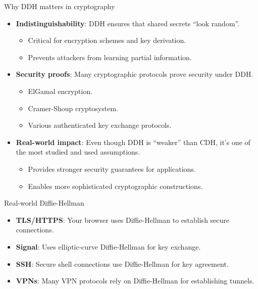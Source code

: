 \documentclass[aspectratio=169, lualatex, handout]{beamer}
\begin{document}
\begin{frame}{Why DDH matters in cryptography}
	\begin{itemize}[<+->]
		\item \textbf{Indistinguishability}: DDH ensures that shared secrets ``look random''.
		      \begin{itemize}
			      \item Critical for encryption schemes and key derivation.
			      \item Prevents attackers from learning partial information.
		      \end{itemize}
		\item \textbf{Security proofs}: Many cryptographic protocols prove security under DDH.
		      \begin{itemize}
			      \item ElGamal encryption.
			      \item Cramer-Shoup cryptosystem.
			      \item Various authenticated key exchange protocols.
		      \end{itemize}
		\item \textbf{Real-world impact}: Even though DDH is ``weaker'' than CDH, it's one of the most studied and used assumptions.
		      \begin{itemize}
			      \item Provides stronger security guarantees for applications.
			      \item Enables more sophisticated cryptographic constructions.
		      \end{itemize}
	\end{itemize}
\end{frame}

\begin{frame}{Real-world Diffie-Hellman}
	\begin{itemize}[<+->]
		\item \textbf{TLS/HTTPS}: Your browser uses Diffie-Hellman to establish secure connections.
		\item \textbf{Signal}: Uses elliptic-curve Diffie-Hellman for key exchange.
		\item \textbf{SSH}: Secure shell connections use Diffie-Hellman for key agreement.
		\item \textbf{VPNs}: Many VPN protocols rely on Diffie-Hellman for establishing tunnels.
	\end{itemize}
	\vspace{0.5cm}
\end{frame}
\end{document}

